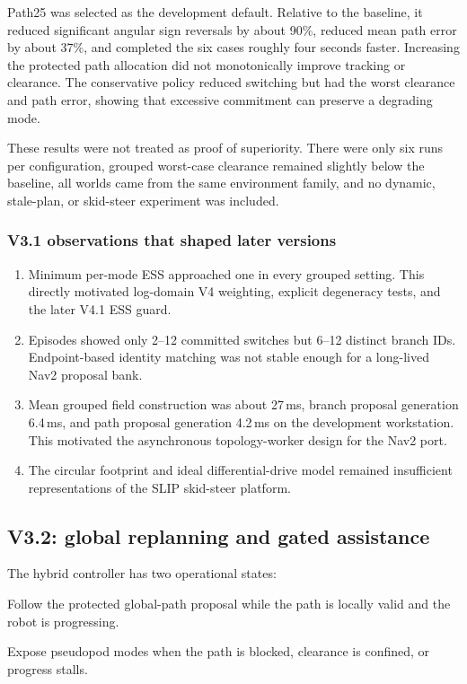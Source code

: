 \documentclass[11pt,a4paper]{article}
\begin{document}
Path25 was selected as the development default. Relative to the baseline, it
reduced significant angular sign reversals by about 90\%, reduced mean path
error by about 37\%, and completed the six cases roughly four seconds faster.
Increasing the protected path allocation did not monotonically improve
tracking or clearance. The conservative policy reduced switching but had the
worst clearance and path error, showing that excessive commitment can preserve
a degrading mode.

These results were not treated as proof of superiority. There were only six
runs per configuration, grouped worst-case clearance remained slightly below
the baseline, all worlds came from the same environment family, and no dynamic,
stale-plan, or skid-steer experiment was included.

\subsubsection{V3.1 observations that shaped later versions}

\begin{enumerate}[leftmargin=*]
  \item Minimum per-mode ESS approached one in every grouped setting. This
  directly motivated log-domain V4 weighting, explicit degeneracy tests, and
  the later V4.1 ESS guard.
  \item Episodes showed only 2--12 committed switches but 6--12 distinct branch
  IDs. Endpoint-based identity matching was not stable enough for a long-lived
  Nav2 proposal bank.
  \item Mean grouped field construction was about 27\,ms, branch proposal
  generation 6.4\,ms, and path proposal generation 4.2\,ms on the development
  workstation. This motivated the asynchronous topology-worker design for the
  Nav2 port.
  \item The circular footprint and ideal differential-drive model remained
  insufficient representations of the SLIP skid-steer platform.
\end{enumerate}

\subsection{V3.2: global replanning and gated assistance}

The hybrid controller has two operational states:
\begin{description}[leftmargin=2.8cm,style=nextline]
  \item[NORMAL] Follow the protected global-path proposal while the path is
  locally valid and the robot is progressing.
  \item[ASSIST] Expose pseudopod modes when the path is blocked, clearance is
  confined, or progress stalls.
\end{description}
\end{document}
